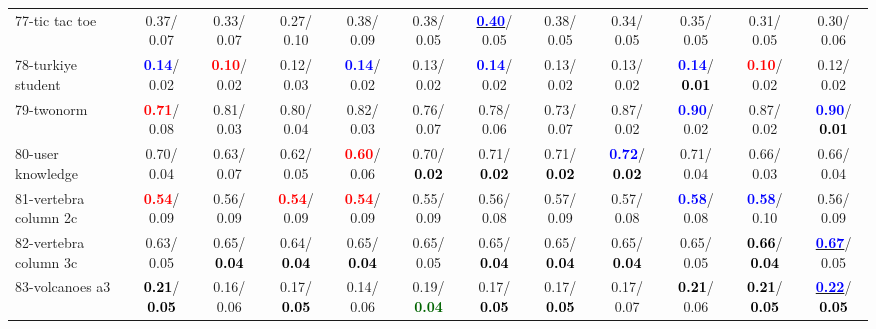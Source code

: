 \begin{table}[h]
\begin{center}
{\begin{tabular}{lc|c|c|c|c|c|c|c|c|c|c}
77-tic tac toe &   0.37/  0.07 &   0.33/  0.07 &   0.27/  0.10 &   0.38/  0.09 &   0.38/  0.05 & \underline{\textcolor{blue}{\textbf{  0.40}}}/  0.05 &   0.38/  0.05 &   0.34/  0.05 &   0.35/  0.05 &   0.31/  0.05 &   0.30/  0.06 \\
78-turkiye student & \textcolor{blue}{\textbf{  0.14}}/  0.02 & \textcolor{red}{\textbf{  0.10}}/  0.02 &   0.12/  0.03 & \textcolor{blue}{\textbf{  0.14}}/  0.02 &   0.13/  0.02 & \textcolor{blue}{\textbf{  0.14}}/  0.02 &   0.13/  0.02 &   0.13/  0.02 & \textcolor{blue}{\textbf{  0.14}}/\textcolor{black}{\textbf{  0.01}} & \textcolor{red}{\textbf{  0.10}}/  0.02 &   0.12/  0.02 \\ \hline
79-twonorm & \textcolor{red}{\textbf{  0.71}}/  0.08 &   0.81/  0.03 &   0.80/  0.04 &   0.82/  0.03 &   0.76/  0.07 &   0.78/  0.06 &   0.73/  0.07 &   0.87/  0.02 & \textcolor{blue}{\textbf{  0.90}}/  0.02 &   0.87/  0.02 & \textcolor{blue}{\textbf{  0.90}}/\textcolor{black}{\textbf{  0.01}} \\
80-user knowledge &   0.70/  0.04 &   0.63/  0.07 &   0.62/  0.05 & \textcolor{red}{\textbf{  0.60}}/  0.06 &   0.70/\textcolor{black}{\textbf{  0.02}} &   0.71/\textcolor{black}{\textbf{  0.02}} &   0.71/\textcolor{black}{\textbf{  0.02}} & \textcolor{blue}{\textbf{  0.72}}/\textcolor{black}{\textbf{  0.02}} &   0.71/  0.04 &   0.66/  0.03 &   0.66/  0.04 \\
81-vertebra column 2c & \textcolor{red}{\textbf{  0.54}}/  0.09 &   0.56/  0.09 & \textcolor{red}{\textbf{  0.54}}/  0.09 & \textcolor{red}{\textbf{  0.54}}/  0.09 &   0.55/  0.09 &   0.56/  0.08 &   0.57/  0.09 &   0.57/  0.08 & \textcolor{blue}{\textbf{  0.58}}/  0.08 & \textcolor{blue}{\textbf{  0.58}}/  0.10 &   0.56/  0.09 \\
82-vertebra column 3c &   0.63/  0.05 &   0.65/\textcolor{black}{\textbf{  0.04}} &   0.64/\textcolor{black}{\textbf{  0.04}} &   0.65/\textcolor{black}{\textbf{  0.04}} &   0.65/  0.05 &   0.65/\textcolor{black}{\textbf{  0.04}} &   0.65/\textcolor{black}{\textbf{  0.04}} &   0.65/\textcolor{black}{\textbf{  0.04}} &   0.65/  0.05 & \textcolor{black}{\textbf{  0.66}}/\textcolor{black}{\textbf{  0.04}} & \underline{\textcolor{blue}{\textbf{  0.67}}}/  0.05 \\
83-volcanoes a3 & \textcolor{black}{\textbf{  0.21}}/\textcolor{black}{\textbf{  0.05}} &   0.16/  0.06 &   0.17/\textcolor{black}{\textbf{  0.05}} &   0.14/  0.06 &   0.19/\textcolor{darkgreen}{\textbf{  0.04}} &   0.17/\textcolor{black}{\textbf{  0.05}} &   0.17/\textcolor{black}{\textbf{  0.05}} &   0.17/  0.07 & \textcolor{black}{\textbf{  0.21}}/  0.06 & \textcolor{black}{\textbf{  0.21}}/\textcolor{black}{\textbf{  0.05}} & \underline{\textcolor{blue}{\textbf{  0.22}}}/\textcolor{black}{\textbf{  0.05}} \\

\end{tabular}}
\end{center}
\end{table}
